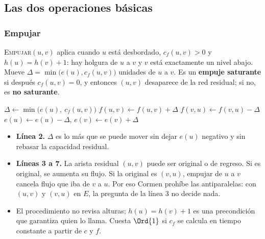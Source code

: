\documentclass[11pt,letterpaper]{article}
\begin{document}
\subsection*{Las dos operaciones básicas}

\subsubsection*{Empujar}

\textsc{Empujar}$(u, v)$ aplica cuando $u$ está desbordado,
$c_f(u, v) > 0$ y $h(u) = h(v) + 1$: hay holgura de $u$ a $v$ y $v$
está exactamente un nivel abajo. Mueve
$\Delta = \min\bigl(e(u), c_f(u, v)\bigr)$ unidades de $u$ a $v$. Es
un \textbf{empuje saturante} si después $c_f(u, v) = 0$, y entonces
$(u, v)$ desaparece de la red residual; si no, es \textbf{no
saturante}.

\begin{algorithm}[H]
\caption{\textsc{Empujar}$(u, v)$ \ (\textsc{Push} en Cormen)}
\label{alg:empujar}
\begin{algorithmic}[1]
  \State $\Delta \gets \min\bigl(e(u),\ c_f(u, v)\bigr)$
    \State $f(u, v) \gets f(u, v) + \Delta$ 
  \Else
    \State $f(v, u) \gets f(v, u) - \Delta$ 
  \EndIf
  \State $e(u) \gets e(u) - \Delta$, \quad $e(v) \gets e(v) + \Delta$
\EndProcedure
\end{algorithmic}
\end{algorithm}

\begin{itemize}
  \item \textbf{Línea 2.} $\Delta$ es lo más que se puede mover sin
        dejar $e(u)$ negativo y sin rebasar la capacidad residual.
  \item \textbf{Líneas 3 a 7.} La arista residual $(u, v)$ puede ser
        original o de regreso. Si es original, se aumenta su flujo. Si
        la original es $(v, u)$, empujar de $u$ a $v$ cancela flujo que
        iba de $v$ a $u$. Por eso Cormen prohíbe las antiparalelas: con
        $(u, v)$ y $(v, u)$ en $E$, la pregunta de la línea 3 no decide
        nada.
  \item El procedimiento no revisa alturas; $h(u) = h(v) + 1$ es una
        precondición que garantiza quien lo llama. Cuesta $\Ord{1}$ si
        $c_f$ se calcula en tiempo constante a partir de $c$ y $f$.
\end{itemize}
\end{document}
